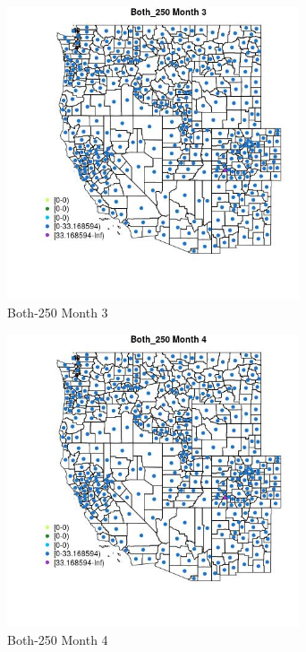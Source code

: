 \begin{figure} 
\centering  
\includegraphics[width=0.77\textwidth]{Code_Outputs/df_report_ML_predictors_CountyCentroid_Locations_Dates_2008-01-01to2018-12-31_MapObsMo3Both_250.jpg} 
\caption{\label{fig:df_report_ML_predictors_CountyCentroid_Locations_Dates_2008-01-01to2018-12-31MapObsMo3Both_250}Both-250 Month 3} 
\end{figure} 
 

\begin{figure} 
\centering  
\includegraphics[width=0.77\textwidth]{Code_Outputs/df_report_ML_predictors_CountyCentroid_Locations_Dates_2008-01-01to2018-12-31_MapObsMo4Both_250.jpg} 
\caption{\label{fig:df_report_ML_predictors_CountyCentroid_Locations_Dates_2008-01-01to2018-12-31MapObsMo4Both_250}Both-250 Month 4} 
\end{figure} 
 

